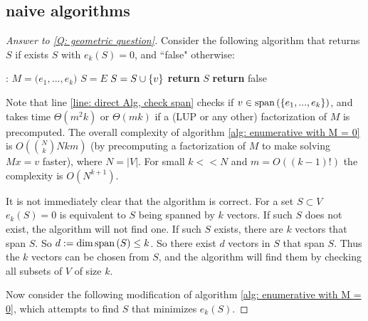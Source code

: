 \documentclass{article}
\begin{document}
\subsection{naive algorithms}
\begin{proof}[Answer to \ref{Q: geometric question}]
Consider the following algorithm that returns $S$ if exists $S$ with $e_k(S) = 0$, and ``false" otherwise:
\begin{algorithm}[H]
      \caption{}\label{alg: enumerative with M = 0}
    \begin{algorithmic}[1]
    :
        \State $M = \Big(e_1,...,e_k\Big)$
        \State $S = E$
            \label{line: direct Alg, check span}
                \State $S = S\cup \left\{v\right\}$
            \EndIf
        \EndFor
            \State \textbf{return} $S$
        \EndIf
    \EndFor
    \State \textbf{return} false
    \EndProcedure
    \end{algorithmic}
\end{algorithm}

Note that line \ref{line: direct Alg, check span} checks if $v\in \text{span}\left(\left\{e_1,...,e_k\right\}\right)$, and takes time $\Theta(m^2k)$ or $\Theta(mk)$ if a (LUP or any other) factorization of $M$ is precomputed. The overall complexity of algorithm \ref{alg: enumerative with M = 0} is $O(\binom{N}{k}Nkm)$ (by precomputing a factorization of $M$ to make solving $Mx=v$ faster), where $N = |V|$. For small $k<<N$ and $m = O((k-1)!)$ the complexity is $O(N^{k+1})$.

It is not immediately clear that the algorithm is correct. For a set $S\subset V$ $e_k(S)=0$ is equivalent to $S$ being spanned by $k$ vectors. If such $S$ does not exist, the algorithm will not find one. If such $S$ exists, there are $k$ vectors that span $S$. So $d := \dim \text{span}\left(S\right) \leq k$. So there exist $d$ vectors in $S$ that span $S$. Thus the $k$ vectors can be chosen from $S$, and the algorithm will find them by checking all subsets of $V$ of size $k$.

Now consider the following modification of algorithm \ref{alg: enumerative with M = 0}, which attempts to find $S$ that minimizes $e_k(S)$.


\end{proof}
\end{document}
